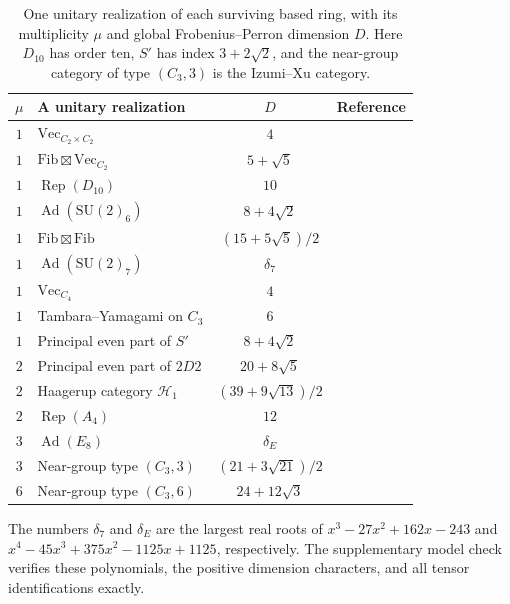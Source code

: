 \begin{table}[htbp]
\centering\small
\begin{tabular}{@{}clcl@{}}
\toprule
$\mu$ & A unitary realization & $D$ & Reference \\
\midrule
$1$ & $\mathrm{Vec}_{C_2\times C_2}$ & $4$ & \cite[\S3.4]{LPR} \\
$1$ & $\mathrm{Fib}\boxtimes\mathrm{Vec}_{C_2}$ & $5+\sqrt{5}$ & \cite[\S3.4]{LPR} \\
$1$ & $\operatorname{Rep}(D_{10})$ & $10$ & \cite[\S3.4]{LPR} \\
$1$ & $\operatorname{Ad}(\mathrm{SU}(2)_6)$ & $8+4\sqrt{2}$ & \cite[Theorem 3.1]{EIP} \\
$1$ & $\mathrm{Fib}\boxtimes\mathrm{Fib}$ & $(15+5\sqrt{5})/2$ & \cite[\S3.4]{LPR} \\
$1$ & $\operatorname{Ad}(\mathrm{SU}(2)_7)$ & $\delta_7$ & \cite[\S3.4]{LPR} \\
$1$ & $\mathrm{Vec}_{C_4}$ & $4$ & \cite[\S3.4]{LPR} \\
$1$ & Tambara--Yamagami on $C_3$ & $6$ & \cite{TambaraYamagami} \\
$1$ & Principal even part of $S'$ & $8+4\sqrt{2}$ & \cite[Theorem 1]{LMP} \\
$2$ & Principal even part of $2D2$ & $20+8\sqrt{5}$ & \cite[Theorem 3.1]{EIP} \\
$2$ & Haagerup category $\mathcal H_1$ & $(39+9\sqrt{13})/2$ & \cite[Table 2]{GrossmanSnyder} \\
$2$ & $\operatorname{Rep}(A_4)$ & $12$ & \cite[Theorem 1.1]{Larson} \\
$3$ & $\operatorname{Ad}(E_8)$ & $\delta_E$ & \cite{IzumiE8,EvansJones} \\
$3$ & Near-group type $(C_3,3)$ & $(21+3\sqrt{21})/2$ & \cite[Example 9.4]{Izumi} \\
$6$ & Near-group type $(C_3,6)$ & $24+12\sqrt{3}$ & \cite[Theorem 10.19]{Izumi} \\
\bottomrule
\end{tabular}
\caption{One unitary realization of each surviving based ring, with its
multiplicity $\mu$ and global Frobenius--Perron dimension $D$.
Here $D_{10}$ has order ten, $S'$ has index $3+2\sqrt2$, and the
near-group category of type $(C_3,3)$ is the Izumi--Xu category.}
\label{finite:tab:models}
\smallskip
\begin{minipage}{\textwidth}\footnotesize
The numbers $\delta_7$ and $\delta_E$ are the largest real roots of
$x^3-27x^2+162x-243$ and
$x^4-45x^3+375x^2-1125x+1125$, respectively.
The supplementary model check verifies these polynomials, the positive
dimension characters, and all tensor identifications exactly.
\end{minipage}
\end{table}
